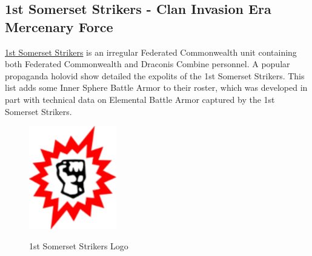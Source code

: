 \subsection{1st Somerset Strikers - Clan Invasion Era Mercenary Force}

\href{https://www.sarna.net/wiki/1st_Somerset_Strikers}{1st Somerset Strikers} is an irregular Federated Commonwealth unit containing both Federated Commonwealth and Draconis Combine  personnel.
A popular propaganda holovid show detailed the expolits of the 1st Somerset Strikers.
This list adds some Inner Sphere Battle Armor to their roster, which was developed in part with technical data on Elemental Battle Armor captured by the 1st Somerset Strikers.

\begin{figure}[!h]
  \centering
  \includegraphics[alt='1st Somerset Strikers Logo', width=1.5in, height=1.778in]{img/1st-Somerset-Strikers.png}
  \caption*{1st Somerset Strikers Logo}
\end{figure}

